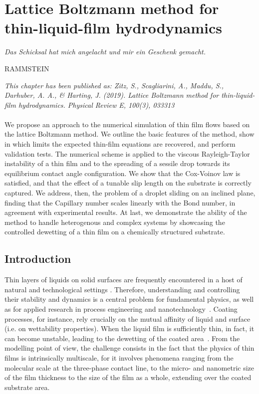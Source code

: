 \chapter{Lattice Boltzmann method for thin-liquid-film hydrodynamics}
\label{chapter:first_paper}
\epigraph{\textit{Das Schicksal hat mich angelacht und mir ein Geschenk gemacht.}}{RAMMSTEIN}

\textit{\small{This chapter has been published as: Zitz, S., Scagliarini, A., Maddu, S., Darhuber, A. A., \& Harting, J. (2019). Lattice Boltzmann method for thin-liquid-film hydrodynamics. Physical Review E, 100(3), 033313}}
\\
\\

We propose an approach to the numerical simulation of thin film flows based on the lattice Boltzmann method.
We outline the basic features of the method, show in which limits the expected thin-film equations are recovered, and perform validation tests.
The numerical scheme is applied to the viscous Rayleigh-Taylor instability of a thin film and to the spreading of a sessile drop towards its equilibrium contact angle configuration. 
We show that the Cox-Voinov law is satisfied, and that the effect of a tunable slip length on the substrate is correctly captured. 
We address, then, the problem of a droplet sliding on an inclined plane, finding that the Capillary number scales linearly with the Bond number, in agreement with experimental results. 
At last, we demonstrate the ability of the method to handle heterogenous and complex systems by showcasing the controlled dewetting of a thin film on a chemically structured substrate.

\section{Introduction}
Thin layers of liquids on solid surfaces are frequently encountered in a host of natural and technological settings \cite{degennesCapillarityWettingPhenomena2004,fockeLabonaFoilMicrofluidicsThin2010}. 
Therefore, understanding and controlling their stability and dynamics is a central problem for fundamental physics, as well as for applied research in process engineering and nanotechnology~\cite{oronLongscaleEvolutionThin1997,utadaDrippingJettingDrops2007}. 
Coating processes, for instance, rely crucially on the mutual affinity of liquid and surface (i.e. on wettability properties). 
When the liquid film is sufficiently thin, in fact, it can become unstable, leading to the dewetting of the coated area~\cite{bonnWettingSpreading2009}. 
From the modelling point of view, the challenge consists in the fact that the physics of thin films is intrinsically multiscale, for it involves phenomena ranging from the molecular scale at the three-phase contact line, to the micro- and nanometric size of the film thickness to the size of the film as a whole, extending over the coated substrate area.

